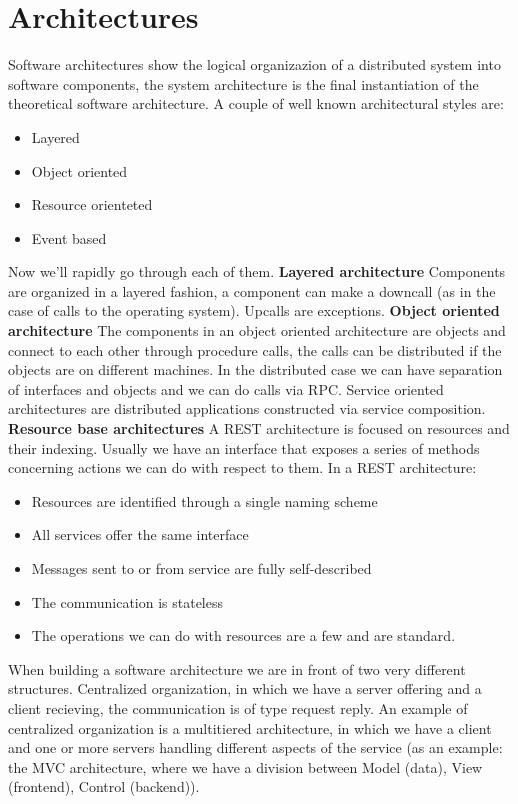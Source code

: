 \chapter{Architectures}
Software architectures show the logical organizazion of a distributed system into software components, the system architecture is the final instantiation of the theoretical software architecture. \n
A couple of well known architectural styles are:
\begin{itemize}
    \item Layered
    \item Object oriented
    \item Resource orienteted
    \item Event based
\end{itemize}
Now we'll rapidly go through each of them. \n
\textbf{Layered architecture} \n
Components are organized in a layered fashion, a component can make a downcall (as in the case of calls to the operating system). \n
Upcalls are exceptions.
\smallSpace
\textbf{Object oriented architecture} \n
The components in an object oriented architecture are objects and connect to each other through procedure calls, the calls can be distributed if the objects are on different machines. \n
In the distributed case we can have separation of interfaces and objects and we can do calls via RPC. \n
Service oriented architectures are distributed applications constructed via service composition. \n
\smallSpace
\textbf{Resource base architectures} \n
A REST architecture is focused on resources and their indexing. Usually we have an interface that exposes a series of methods concerning actions we can do with respect to them. In a REST architecture:
\begin{itemize}
    \item Resources are identified through a single naming scheme
    \item All services offer the same interface
    \item Messages sent to or from service are fully self-described
    \item The communication is stateless
    \item The operations we can do with resources are a few and are standard.
\end{itemize}
When building a software architecture we are in front of two very different structures. Centralized organization, in which we have a server offering and a client recieving, the communication is of type request reply. \n
An example of centralized organization is a multitiered architecture, in which we have a client and one or more servers handling different aspects of the service (as an example: the MVC architecture, where we have a division between Model (data), View (frontend), Control (backend)). \n
